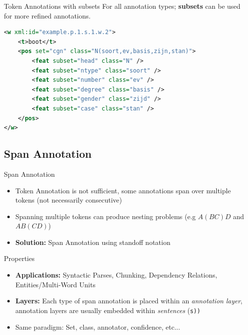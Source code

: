 \documentclass[compress,10pt]{beamer}
\begin{document}
\begin{frame}[fragile]

	\begin{block}{Token Annotations with subsets}
		For all annotation types; \textbf{subsets} can be used for more refined annotations.  
	\end{block}
	
	\begin{example}
\begin{lstlisting}[language=xml]
<w xml:id="example.p.1.s.1.w.2">
    <t>boot</t>
    <pos set="cgn" class="N(soort,ev,basis,zijn,stan)">
        <feat subset="head" class="N" />
        <feat subset="ntype" class="soort" />
        <feat subset="number" class="ev" />
        <feat subset="degree" class="basis" />
        <feat subset="gender" class="zijd" />
        <feat subset="case" class="stan" />
    </pos>
</w>
\end{lstlisting}   
	\end{example} 

\end{frame}



\subsection{Span Annotation}
        
\begin{frame}
    \begin{block}{Span Annotation}
        \begin{itemize}
            \item Token Annotation is not sufficient, some annotations span over multiple tokens (not necessarily consecutive)
            \item Spanning multiple tokens can produce nesting problems (e.g $A (B C) D$ and $A B (C D)$)                
            \item \textbf{Solution:} Span Annotation using standoff notation
        \end{itemize}        
    \end{block}
    
    \begin{block}{Properties}
    	\begin{itemize}
    	 \item \textbf{Applications:} Syntactic Parses, Chunking, Dependency Relations, Entities/Multi-Word Units    	
         \item \textbf{Layers:} Each type of span annotation is placed within an \emph{annotation layer}, annotation layers are usually embedded within \emph{sentences} (\texttt{s))}
         \item Same paradigm: Set, class, annotator, confidence, etc...
        \end{itemize}
    \end{block}
\end{frame}
\end{document}
